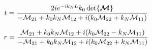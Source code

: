 
\begin{align*}
	t = \frac{
	2ie^{-ik_N L}k_0\det{\boldsymbol{\mathcal{M}}}
	}{
	- \mathcal{M}_{21} + k_0k_N \mathcal{M}_{12} + i\pqty{k_0\mathcal{M}_{22}  + k_N\mathcal{M}_{11}}} 
\end{align*}


\begin{align*}
	r = \frac{
	\mathcal{M}_{21} + k_0k_N \mathcal{M}_{12} + i\pqty{k_0\mathcal{M}_{22} - k_N\mathcal{M}_{11}}
	}{
	- \mathcal{M}_{21} + k_0 k_N \mathcal{M}_{12} + i\pqty{k_0\mathcal{M}_{22} + k_N\mathcal{M}_{11}}}
\end{align*}


